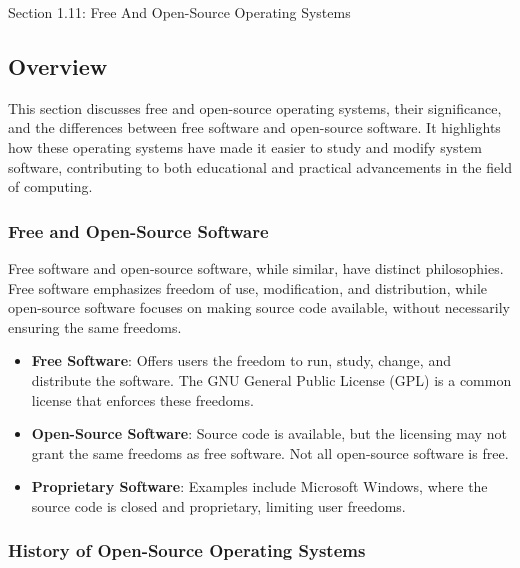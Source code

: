 \begin{notes}{Section 1.11: Free And Open-Source Operating Systems}
    \subsection*{Overview}

    This section discusses free and open-source operating systems, their significance, and the differences between free software and open-source software. It highlights how these operating systems 
    have made it easier to study and modify system software, contributing to both educational and practical advancements in the field of computing.
    
    \subsubsection*{Free and Open-Source Software}
    
    Free software and open-source software, while similar, have distinct philosophies. Free software emphasizes freedom of use, modification, and distribution, while open-source software focuses on 
    making source code available, without necessarily ensuring the same freedoms.
    
    \begin{highlight}
    
    \begin{itemize}
        \item \textbf{Free Software}: Offers users the freedom to run, study, change, and distribute the software. The GNU General Public License (GPL) is a common license that enforces these freedoms.
        \item \textbf{Open-Source Software}: Source code is available, but the licensing may not grant the same freedoms as free software. Not all open-source software is free.
        \item \textbf{Proprietary Software}: Examples include Microsoft Windows, where the source code is closed and proprietary, limiting user freedoms.
    \end{itemize}
    
    \end{highlight}
    
    \subsubsection*{History of Open-Source Operating Systems}
    

\end{notes}
